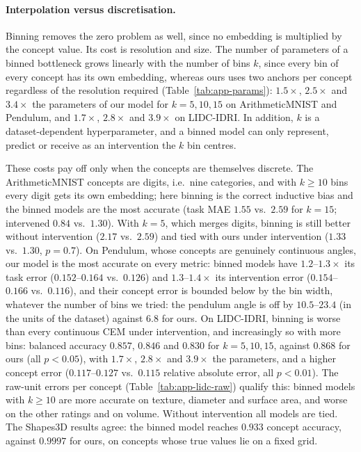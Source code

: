 \paragraph{Interpolation versus discretisation.}
Binning removes the zero problem as well, since no embedding is multiplied by
the concept value. Its cost is resolution and size. The number of parameters
of a binned bottleneck grows linearly with the number of bins $k$, since every
bin of every concept has its own embedding, whereas ours uses two anchors per
concept regardless of the resolution required (Table~\ref{tab:app-params}):
$1.5\times$, $2.5\times$ and $3.4\times$ the parameters of our model for
$k = 5, 10, 15$ on ArithmeticMNIST and Pendulum, and $1.7\times$, $2.8\times$
and $3.9\times$ on LIDC-IDRI. In addition, $k$ is a dataset-dependent hyperparameter, and a
binned model can only represent, predict or receive as an intervention the
$k$ bin centres.

These costs pay off only when the concepts are themselves discrete. The
ArithmeticMNIST concepts are digits, i.e.\ nine categories, and with $k \geq 10$
bins every digit gets its own embedding; here binning is the correct inductive
bias and the binned models are the most accurate (task MAE $1.55$ vs.\ $2.59$
for $k = 15$; intervened $0.84$ vs.\ $1.30$). With $k = 5$, which merges
digits, binning is still better without intervention ($2.17$ vs.\ $2.59$) and
tied with ours under intervention ($1.33$ vs.\ $1.30$, $p = 0.7$). On Pendulum, whose concepts are genuinely continuous
angles, our model is the most accurate on every metric: binned models have
$1.2$--$1.3\times$ its task error ($0.152$--$0.164$ vs.\ $0.126$) and
$1.3$--$1.4\times$ its intervention error ($0.154$--$0.166$ vs.\ $0.116$), and
their concept error is bounded below by the bin width, whatever the number of
bins we tried: the pendulum angle is off by $10.5$--$23.4$ (in the units of the
dataset) against $6.8$ for ours. On LIDC-IDRI, binning is
worse than every continuous CEM under intervention, and increasingly so with
more bins: balanced accuracy $0.857$, $0.846$ and $0.830$ for $k = 5, 10, 15$,
against $0.868$ for ours (all $p < 0.05$), with $1.7\times$, $2.8\times$ and
$3.9\times$ the parameters, and a higher concept error ($0.117$--$0.127$ vs.\
$0.115$ relative absolute error, all $p < 0.01$). The raw-unit errors per concept
(Table~\ref{tab:app-lidc-raw}) qualify this: binned models with $k \ge 10$ are
more accurate on texture, diameter and surface area, and worse on the other
ratings and on volume. Without intervention all models are tied. The Shapes3D results agree: the binned model reaches $0.933$
concept accuracy, against $0.9997$ for ours, on concepts whose true values lie
on a fixed grid.

